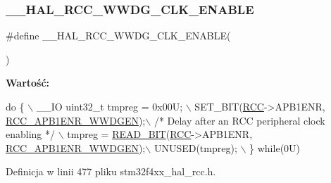\subsubsection{\texorpdfstring{\+\_\+\+\_\+\+H\+A\+L\+\_\+\+R\+C\+C\+\_\+\+W\+W\+D\+G\+\_\+\+C\+L\+K\+\_\+\+E\+N\+A\+B\+LE}{\_\_HAL\_RCC\_WWDG\_CLK\_ENABLE}}
{\footnotesize\ttfamily \#define \+\_\+\+\_\+\+H\+A\+L\+\_\+\+R\+C\+C\+\_\+\+W\+W\+D\+G\+\_\+\+C\+L\+K\+\_\+\+E\+N\+A\+B\+LE(\begin{DoxyParamCaption}{ }\end{DoxyParamCaption})}

{\bfseries Wartość\+:}
\begin{DoxyCode}
\textcolor{keywordflow}{do} \{ \(\backslash\)
                                        \_\_IO uint32\_t tmpreg = 0x00U; \(\backslash\)
                                        SET\_BIT(\hyperlink{group___peripheral__declaration_ga74944438a086975793d26ae48d5882d4}{RCC}->APB1ENR, 
      \hyperlink{group___peripheral___registers___bits___definition_gaf712b922ee776a972d2efa3da0ea4733}{RCC\_APB1ENR\_WWDGEN});\(\backslash\)
                                        \textcolor{comment}{/* Delay after an RCC peripheral clock enabling */} \(\backslash\)
                                        tmpreg = \hyperlink{group___exported__macro_ga822bb1bb9710d5f2fa6396b84e583c33}{READ\_BIT}(\hyperlink{group___peripheral__declaration_ga74944438a086975793d26ae48d5882d4}{RCC}->APB1ENR, 
      \hyperlink{group___peripheral___registers___bits___definition_gaf712b922ee776a972d2efa3da0ea4733}{RCC\_APB1ENR\_WWDGEN});\(\backslash\)
                                        UNUSED(tmpreg); \(\backslash\)
                                          \} \textcolor{keywordflow}{while}(0U)
\end{DoxyCode}


Definicja w linii 477 pliku stm32f4xx\+\_\+hal\+\_\+rcc.\+h.

